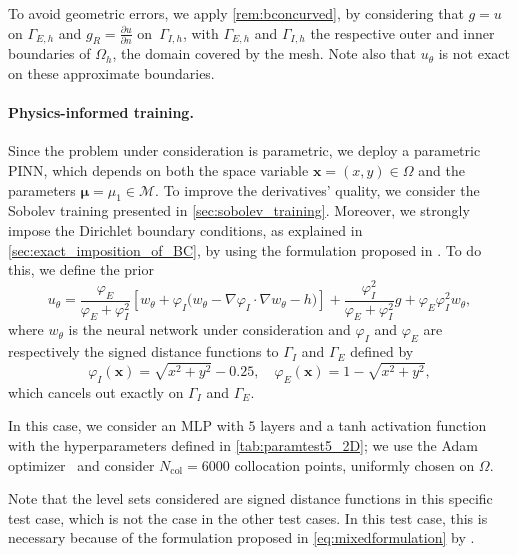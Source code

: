 \begin{remark}
	To avoid geometric errors, we apply \cref{rem:bconcurved}, by considering that $g=u$ on $\Gamma_{E,h}$ and $g_R=\frac{\partial u}{\partial n}$ on~$\Gamma_{I,h}$, with $\Gamma_{E,h}$ and $\Gamma_{I,h}$ the respective outer and inner boundaries of $\Omega_h$, the domain covered by the mesh. Note also that $u_\theta$ is not exact on these approximate boundaries.
\end{remark}

\paragraph*{Physics-informed training.} Since the problem under consideration is parametric,
we deploy a parametric PINN,
which depends on both the space variable $\bm{x}=(x,y) \in \Omega$
and the parameters $\bm{\mu}=\mu_1 \in \mathcal{M}$. To improve the derivatives' quality, we consider the Sobolev training presented in \cref{sec:sobolev_training}. Moreover, we strongly impose the Dirichlet boundary conditions,
as explained in \cref{sec:exact_imposition_of_BC}, by using the formulation proposed in \cite{Sukumar_2022}.
To do this, we define the prior
\begin{equation}\label{eq:mixedformulation}
	u_{\theta} = \frac{\varphi_E}{\varphi_E+\varphi_I^2}\left[w_\theta+\varphi_I\big(w_\theta-\nabla\varphi_I\cdot\nabla w_\theta-h\big)\right] + \frac{\varphi_I^2}{\varphi_E+\varphi_I^2}g+\varphi_E\varphi_I^2w_\theta,
\end{equation}
where $w_\theta$ is the neural network under consideration and $\varphi_I$ and $\varphi_E$ are respectively the signed distance functions to $\Gamma_I$ and $\Gamma_E$ defined by
\begin{equation*}
	\varphi_I(\bm{x})=\sqrt{x^2+y^2}-0.25, \quad \varphi_E(\bm{x})=1-\sqrt{x^2+y^2},
\end{equation*}
which cancels out exactly on $\Gamma_I$ and $\Gamma_E$.

In this case, we consider an MLP with $5$ layers and a tanh activation function with the hyperparameters defined in \cref{tab:paramtest5_2D};
we use the Adam optimizer~\cite{KinBa2015} and consider $N_\text{col}=6000$ collocation points, uniformly chosen on $\Omega$.



\begin{remark}
	Note that the level sets considered are signed distance functions in this specific test case, which is not the case in the other test cases. In this test case, this is necessary because of the formulation proposed in \eqref{eq:mixedformulation} by \cite{Sukumar_2022}.
\end{remark}

